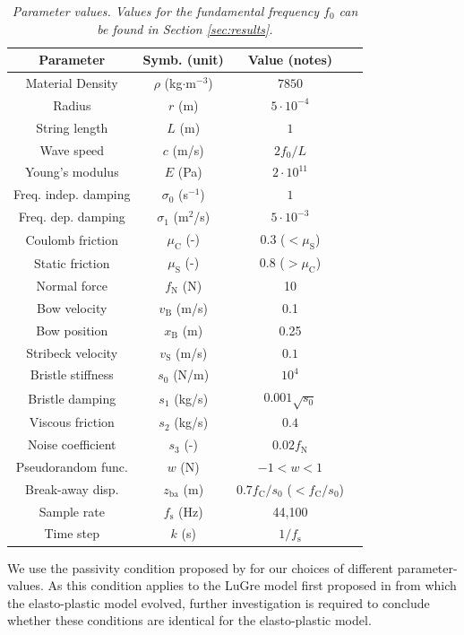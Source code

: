    \begin{table}[ht]
      \caption{{\it Parameter values. Values for the fundamental frequency $f_0$ can be found in Section \ref{sec:results}.}}
        \centering
      \begin{tabular}{|c|c|c|c|}\hline
        Parameter & Symb. (unit) & Value (notes)\\ \hline
        Material Density &$\rho$ (kg$\cdot$m$^{-3}$) & $7850$ \\
        Radius & $r$ (m) & $5\cdot10^{-4}$\\
        String length & $L$ (m) & $1$ \\
        Wave speed & $c$ (m/s) & $2 f_0/L$\\
        Young's modulus & $E$ (Pa) & $2\cdot 10^{11}$\\
        Freq. indep. damping & $\sigma_0$ (s$^{-1}$) & $1$\\
        Freq. dep. damping & $\sigma_1$ (m$^{2}$/s) & $5 \cdot 10^{-3}$\\
        Coulomb friction & $\mu_\text{C}$ (-) & $0.3$ ($<\mu_\text{S}$) \\
        Static friction & $\mu_\text{S}$ (-) & $0.8$ ($>\mu_\text{C}$) \\
        Normal force & $f_\text{N}$ (N) & 10 \\
        Bow velocity & $v_\text{B}$ (m/s) & 0.1 \\
        Bow position & $x_\text{B}$ (m) & 0.25 \\
        Stribeck velocity & $v_\text{S}$ (m/s) & $0.1$ \\
        Bristle stiffness & $s_0$ (N/m)& $10^4$ \\
        Bristle damping & $s_1$ (kg/s)& $0.001\sqrt{s_0}$ \\
        Viscous friction & $s_2$ (kg/s) & $0.4$ \\
        Noise coefficient & $s_3$ (-) & $0.02f_\text{N}$\\
        Pseudorandom func. & $w$ (N) & $-1<w<1$\\
        Break-away disp.& $z_\text{ba}$ (m) & $0.7 f_\text{C}/s_0$ ($<f_\text{C}/s_0$) \\
        Sample rate & $f_\text{s}$ (Hz) & 44,100 \\
        Time step & $k$ (s) & $1/f_\text{s}$ \\
        \hline
     \end{tabular}
      \label{tab:parameters}
    \end{table}
    We use the passivity condition proposed by \cite{Astrom2008} for our choices of different parameter-values. As this condition applies to the LuGre model first proposed in \cite{Canudas1993, Canudas1995} from which the elasto-plastic model evolved, further investigation is required to conclude whether these conditions are identical for the elasto-plastic model.
